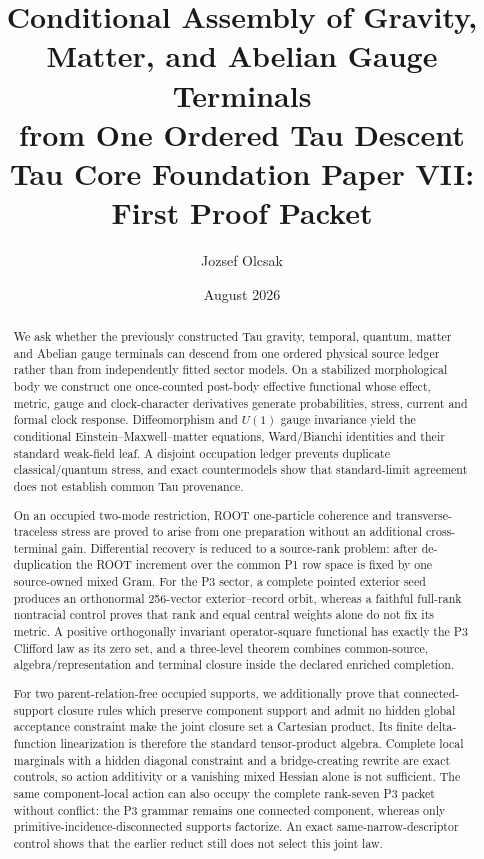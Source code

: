 \documentclass[11pt]{article}
\title{Conditional Assembly of Gravity, Matter, and Abelian Gauge Terminals\\from One Ordered Tau Descent\\\large Tau Core Foundation Paper VII: First Proof Packet}
\author{Jozsef Olcsak}
\date{August 2026}
\begin{document}
\maketitle

\begin{abstract}
We ask whether the previously constructed Tau gravity, temporal, quantum,
matter and Abelian gauge terminals can descend from one ordered physical
source ledger rather than from independently fitted sector models.  On a
stabilized morphological body we construct one once-counted post-body
effective functional whose effect, metric, gauge and clock-character
derivatives generate probabilities, stress, current and formal clock
response.  Diffeomorphism and $U(1)$ gauge invariance yield the conditional
Einstein--Maxwell--matter equations, Ward/Bianchi identities and their
standard weak-field leaf.  A disjoint occupation ledger prevents duplicate
classical/quantum stress, and exact countermodels show that standard-limit
agreement does not establish common Tau provenance.

On an occupied two-mode restriction, ROOT one-particle coherence and
transverse-traceless stress are proved to arise from one preparation without
an additional cross-terminal gain.  Differential recovery is reduced to a
source-rank problem: after de-duplication the ROOT increment over the common
P1 row space is fixed by one source-owned mixed Gram.  For the P3 sector, a
complete pointed exterior seed produces an orthonormal 256-vector
exterior--record orbit, whereas a faithful full-rank nontracial control proves
that rank and equal central weights alone do not fix its metric.  A positive
orthogonally invariant operator-square functional has exactly the P3 Clifford
law as its zero set, and a three-level theorem combines common-source,
algebra/representation and terminal closure inside the declared enriched
completion.

For two parent-relation-free occupied supports, we additionally prove that
connected-support closure rules which preserve component support and admit no
hidden global acceptance constraint make the joint closure set a Cartesian
product.  Its finite delta-function linearization is therefore the standard
tensor-product algebra.  Complete local marginals with a hidden diagonal
constraint and a bridge-creating rewrite are exact controls, so action
additivity or a vanishing mixed Hessian alone is not sufficient.
The same component-local action can also occupy the complete rank-seven P3
packet without conflict: the P3 grammar remains one connected component,
whereas only primitive-incidence-disconnected supports factorize.  An exact
same-narrow-descriptor control shows that the earlier reduct still does not
select this joint law.


\end{abstract}
\end{document}
